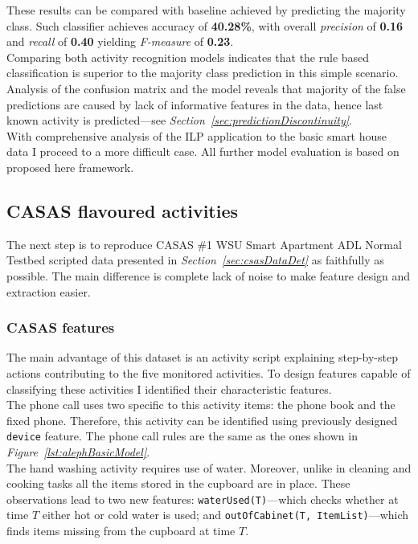 \documentclass[10pt, a4paper, pdflatex, leqno, twoside, openright]{report}
\begin{document}
These results can be compared with baseline achieved by predicting the majority class. Such classifier achieves accuracy of \textbf{40.28\%}, with overall \emph{precision} of \textbf{0.16} and \emph{recall} of \textbf{0.40} yielding \emph{F-measure} of \textbf{0.23}.\\

Comparing both activity recognition models indicates that the rule based classification is superior to the majority class prediction in this simple scenario. Analysis of the confusion matrix and the model reveals that majority of the false predictions are caused by lack of informative features in the data, hence last known activity is predicted---see \emph{Section~\ref{sec:predictionDiscontinuity}}.\\

With comprehensive analysis of the ILP application to the basic smart house data I proceed to a more difficult case. All further model evaluation is based on proposed here framework.

    \subsection{CASAS flavoured activities\label{sec:CASASflavour}}
The next step is to reproduce CASAS \#1 WSU Smart Apartment ADL Normal Testbed scripted data presented in \emph{Section~\ref{sec:csasDataDet}} as faithfully as possible. The main difference is complete lack of noise to make feature design and extraction easier.

      \subsubsection{CASAS features}
The main advantage of this dataset is an activity script explaining step-by-step actions contributing to the five monitored activities. To design features capable of classifying these activities I identified their characteristic features.\\

The phone call uses two specific to this activity items: the phone book and the fixed phone. Therefore, this activity can be identified using previously designed \texttt{device} feature. The phone call rules are the same as the ones shown in \emph{Figure~\ref{lst:alephBasicModel}}.\\

The hand washing activity requires use of water. Moreover, unlike in cleaning and cooking tasks all the items stored in the cupboard are in place. These observations lead to two new features: \texttt{waterUsed(T)}---which checks whether at time $T$ either hot or cold water is used; and \texttt{outOfCabinet(T, ItemList)}---which finds items missing from the cupboard at time $T$.\\
\end{document}
